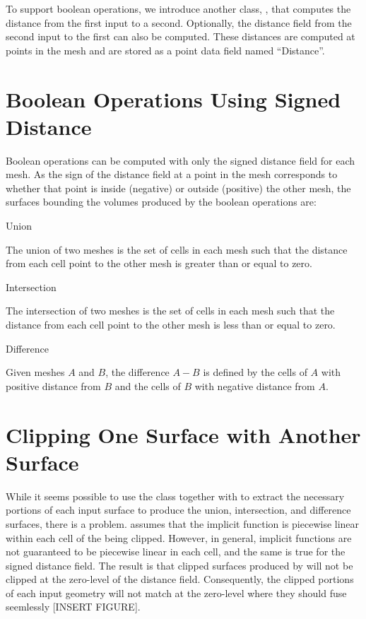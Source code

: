 \documentclass{InsightArticle}
\begin{document}
To support boolean operations, we introduce another class, , that computes the distance from the first input  to a second. Optionally, the distance field from the second input  to the first can also be computed. These distances are computed at points in the mesh and are stored as a point data field named ``Distance''.

\section{Boolean Operations Using Signed Distance}

Boolean operations can be computed with only the signed distance field for each mesh. As the sign of the distance field at a point in the mesh corresponds to whether that point is inside (negative) or outside (positive) the other mesh, the surfaces bounding the volumes produced by the boolean operations are:

\begin{description}

\item Union

The union of two meshes is the set of cells in each mesh such that the distance from each cell point to the other mesh is greater than or equal to zero.

\item Intersection

The intersection of two meshes is the set of cells in each mesh such that the distance from each cell point to the other mesh is less than or equal to zero.

\item Difference

Given meshes $A$ and $B$, the difference $A-B$ is defined by the cells of $A$ with positive distance from $B$ and the cells of $B$ with negative distance from $A$.

\end{description}

\section{Clipping One Surface with Another Surface}

While it seems possible to use the class  together with  to extract the necessary portions of each input surface to produce the union, intersection, and difference surfaces, there is a problem.  assumes that the implicit function is piecewise linear within each cell of the  being clipped. However, in general, implicit functions are not guaranteed to be piecewise linear in each cell, and the same is true for the signed distance field. The result is that clipped surfaces produced by  will not be clipped at the zero-level of the distance field. Consequently, the clipped portions of each input geometry will not match at the zero-level where they should fuse seemlessly [INSERT FIGURE].
\end{document}
